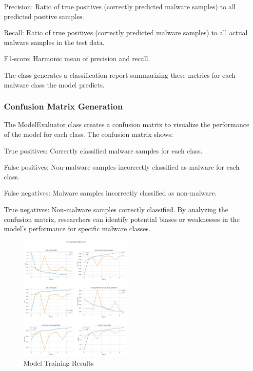\documentclass[conference]{IEEEtran}
\begin{document}
        Precision: Ratio of true positives (correctly predicted malware samples) to all predicted positive samples.
        
        Recall: Ratio of true positives (correctly predicted malware samples) to all actual malware samples in the test data.
        
        F1-score: Harmonic mean of precision and recall.
    
    The class  generates a classification report summarizing these metrics for each malware class the model predicts.

\subsubsection{Confusion Matrix Generation}

    The ModelEvaluator class creates a confusion matrix to visualize the performance of the model for each class. The confusion matrix shows:
        
        True positives: Correctly classified malware samples for each class.
        
        False positives: Non-malware samples incorrectly classified as malware 
        for each class.

        False negatives: Malware samples incorrectly classified as non-malware.
        
        True negatives: Non-malware samples correctly classified.
    By analyzing the confusion matrix, researchers can identify potential biases or weaknesses in the model's performance for specific malware classes.

\begin{figure}[ht] %
  \centering %
  \includegraphics[width=0.5\textwidth]{training history.jpeg} %
  \caption{Model Training Results} %
  \label{fig:example5} %
\end{figure}
\end{document}
